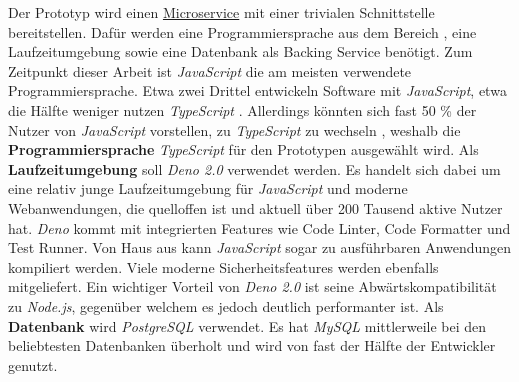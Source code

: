 Der Prototyp wird einen \hyperref[sec:02-02_microservices]{Microservice} mit einer trivialen Schnittstelle bereitstellen. Dafür werden eine Programmiersprache aus dem Bereich , eine Laufzeitumgebung sowie eine Datenbank als Backing Service benötigt. Zum Zeitpunkt dieser Arbeit ist \textit{JavaScript} die am meisten verwendete Programmiersprache. Etwa zwei Drittel entwickeln Software mit \textit{JavaScript}, etwa die Hälfte weniger nutzen \textit{TypeScript} \cite{206:Developer-Survey-2024,207:Developer-Ecosystem}. Allerdings könnten sich fast 50 \% der Nutzer von \textit{JavaScript} vorstellen, zu \textit{TypeScript} zu wechseln \cite{206:Developer-Survey-2024}, weshalb die \textbf{Programmiersprache} \textit{TypeScript} für den Prototypen ausgewählt wird. Als \textbf{Laufzeitumgebung} soll \textit{Deno 2.0} verwendet werden. Es handelt sich dabei um eine relativ junge Laufzeitumgebung für \textit{JavaScript} und moderne Webanwendungen, die quelloffen ist und aktuell über 200 Tausend aktive Nutzer hat. \textit{Deno} kommt mit integrierten Features wie Code Linter, Code Formatter und Test Runner. Von Haus aus kann \textit{JavaScript} sogar zu ausführbaren Anwendungen kompiliert werden. Viele moderne Sicherheitsfeatures werden ebenfalls mitgeliefert. Ein wichtiger Vorteil von \textit{Deno 2.0} ist seine Abwärtskompatibilität zu \textit{Node.js}, gegenüber welchem es jedoch deutlich performanter ist. \cite{309:Deno} Als \textbf{Datenbank} wird \textit{PostgreSQL} verwendet. Es hat \textit{MySQL} mittlerweile bei den beliebtesten Datenbanken überholt und wird von fast der Hälfte der Entwickler genutzt. \cite{206:Developer-Survey-2024}

